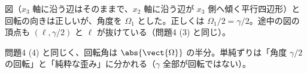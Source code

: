 \begin{kotaeran}
   図（$x_{3}$ 軸に沿う辺はそのままで、$x_{2}$ 軸に沿う辺が $x_{3}$ 側へ傾く平行四辺形）と回転の向きは正しいが、角度を $\Omega_{1}$ とした。正しくは $\Omega_{1}/2=\gamma/2$。途中の図の頂点も $(\ell,\gamma/2)$ と $\ell$ が抜けている（問題4 (3) と同じ）。
\end{kotaeran}
\begin{rikai}
  \item 問題4 (4) と同じく、回転角は $\abs{\vect{\Omega}}$ の半分。単純ずりは「角度 $\gamma/2$ の回転」と「純粋な歪み」に分かれる（$\gamma$ 全部が回転ではない）。
\end{rikai}
